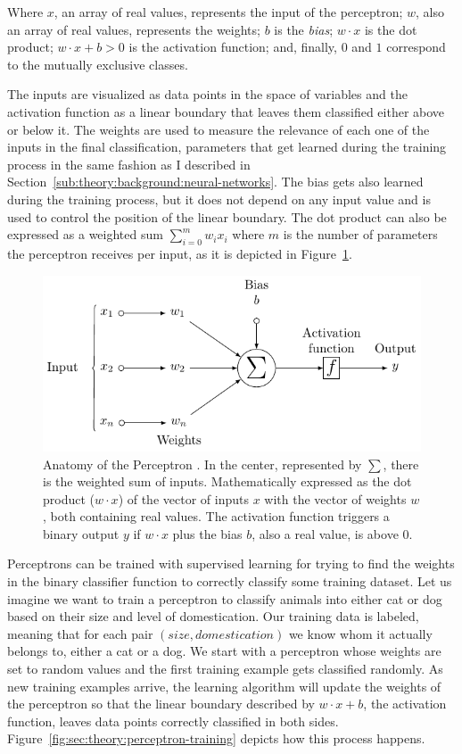 Where $x$, an array of real values, represents the input of the perceptron; $w$, also an array of real values, represents the weights; $b$ is the \emph{bias}; ${w}\cdot{x}$ is the dot product; ${w}\cdot{x}+b > 0$ is the activation function; and, finally, $0$ and $1$ correspond to the mutually exclusive classes.

The inputs are visualized as data points in the space of variables and the activation function as a linear boundary that leaves them classified either above or below it.
The weights are used to measure the relevance of each one of the inputs in the final classification, parameters that get learned during the training process in the same fashion as I described in Section~\ref{sub:theory:background:neural-networks}.
The bias gets also learned during the training process, but it does not depend on any input value and is used to control the position of the linear boundary.
The dot product can also be expressed as a weighted sum $\sum_{i=0}^{m} w_i x_i$ where $m$ is the number of parameters the perceptron receives per input, as it is depicted in Figure~\ref{fig:sec:theory:perceptron}.

\begin{figure}[t]
  \includegraphics[width=\textwidth]{tkz/perceptron}
  \caption{
    Anatomy of the Perceptron \cite{Medina2013}.
    In the center, represented by $\sum$, there is the weighted sum of inputs.
    Mathematically expressed as the dot product (${w}\cdot{x}$) of the vector of inputs $x$ with the vector of weights $w$, both containing real values.
    The activation function triggers a binary output $y$ if ${w}\cdot{x}$ plus the bias $b$, also a real value, is above $0$.
  }
  \label{fig:sec:theory:perceptron}
\end{figure}

Perceptrons can be trained with supervised learning for trying to find the weights in the binary classifier function to correctly classify some training dataset.
Let us imagine we want to train a perceptron to classify animals into either cat or dog based on their size and level of domestication.
Our training data is labeled, meaning that for each pair $(size, domestication)$ we know whom it actually belongs to, either a cat or a dog.
We start with a perceptron whose weights are set to random values and the first training example gets classified randomly.
As new training examples arrive, the learning algorithm will update the weights of the perceptron so that the linear boundary described by ${w}\cdot{x}+b$, the activation function, leaves data points correctly classified in both sides.
Figure~\ref{fig:sec:theory:perceptron-training} depicts how this process happens.

